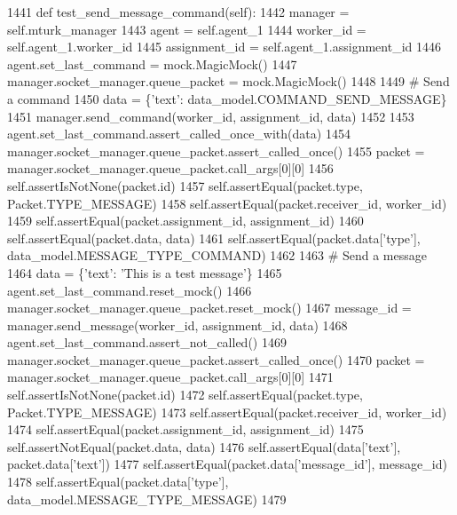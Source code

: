\begin{DoxyCode}
1441     \textcolor{keyword}{def }test\_send\_message\_command(self):
1442         manager = self.mturk\_manager
1443         agent = self.agent\_1
1444         worker\_id = self.agent\_1.worker\_id
1445         assignment\_id = self.agent\_1.assignment\_id
1446         agent.set\_last\_command = mock.MagicMock()
1447         manager.socket\_manager.queue\_packet = mock.MagicMock()
1448 
1449         \textcolor{comment}{# Send a command}
1450         data = \{\textcolor{stringliteral}{'text'}: data\_model.COMMAND\_SEND\_MESSAGE\}
1451         manager.send\_command(worker\_id, assignment\_id, data)
1452 
1453         agent.set\_last\_command.assert\_called\_once\_with(data)
1454         manager.socket\_manager.queue\_packet.assert\_called\_once()
1455         packet = manager.socket\_manager.queue\_packet.call\_args[0][0]
1456         self.assertIsNotNone(packet.id)
1457         self.assertEqual(packet.type, Packet.TYPE\_MESSAGE)
1458         self.assertEqual(packet.receiver\_id, worker\_id)
1459         self.assertEqual(packet.assignment\_id, assignment\_id)
1460         self.assertEqual(packet.data, data)
1461         self.assertEqual(packet.data[\textcolor{stringliteral}{'type'}], data\_model.MESSAGE\_TYPE\_COMMAND)
1462 
1463         \textcolor{comment}{# Send a message}
1464         data = \{\textcolor{stringliteral}{'text'}: \textcolor{stringliteral}{'This is a test message'}\}
1465         agent.set\_last\_command.reset\_mock()
1466         manager.socket\_manager.queue\_packet.reset\_mock()
1467         message\_id = manager.send\_message(worker\_id, assignment\_id, data)
1468         agent.set\_last\_command.assert\_not\_called()
1469         manager.socket\_manager.queue\_packet.assert\_called\_once()
1470         packet = manager.socket\_manager.queue\_packet.call\_args[0][0]
1471         self.assertIsNotNone(packet.id)
1472         self.assertEqual(packet.type, Packet.TYPE\_MESSAGE)
1473         self.assertEqual(packet.receiver\_id, worker\_id)
1474         self.assertEqual(packet.assignment\_id, assignment\_id)
1475         self.assertNotEqual(packet.data, data)
1476         self.assertEqual(data[\textcolor{stringliteral}{'text'}], packet.data[\textcolor{stringliteral}{'text'}])
1477         self.assertEqual(packet.data[\textcolor{stringliteral}{'message\_id'}], message\_id)
1478         self.assertEqual(packet.data[\textcolor{stringliteral}{'type'}], data\_model.MESSAGE\_TYPE\_MESSAGE)
1479 
\end{DoxyCode}
\mbox{\label{classparlai_1_1mturk_1_1core_1_1legacy__2018_1_1test_1_1test__mturk__manager_1_1TestMTurkManagerConnectedFunctions_ac4978b1780d385c5fd4b4dae0e0abcfc}} 
